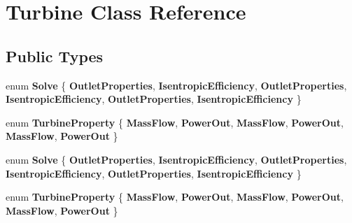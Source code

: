 \hypertarget{class_turbine}{}\section{Turbine Class Reference}
\label{class_turbine}
\subsection*{Public Types}
\begin{DoxyCompactItemize}
\item 
\mbox{\label{class_turbine_a9fd7beba6c6f071e228fbe3e07969d2b}} 
enum {\bfseries Solve} \{ \newline
{\bfseries Outlet\+Properties}, 
{\bfseries Isentropic\+Efficiency}, 
{\bfseries Outlet\+Properties}, 
{\bfseries Isentropic\+Efficiency}, 
\newline
{\bfseries Outlet\+Properties}, 
{\bfseries Isentropic\+Efficiency}
 \}
\item 
\mbox{\label{class_turbine_a5db4f65cf2539e3837684d53221ade12}} 
enum {\bfseries Turbine\+Property} \{ \newline
{\bfseries Mass\+Flow}, 
{\bfseries Power\+Out}, 
{\bfseries Mass\+Flow}, 
{\bfseries Power\+Out}, 
\newline
{\bfseries Mass\+Flow}, 
{\bfseries Power\+Out}
 \}
\item 
\mbox{\label{class_turbine_a9fd7beba6c6f071e228fbe3e07969d2b}} 
enum {\bfseries Solve} \{ \newline
{\bfseries Outlet\+Properties}, 
{\bfseries Isentropic\+Efficiency}, 
{\bfseries Outlet\+Properties}, 
{\bfseries Isentropic\+Efficiency}, 
\newline
{\bfseries Outlet\+Properties}, 
{\bfseries Isentropic\+Efficiency}
 \}
\item 
\mbox{\label{class_turbine_a5db4f65cf2539e3837684d53221ade12}} 
enum {\bfseries Turbine\+Property} \{ \newline
{\bfseries Mass\+Flow}, 
{\bfseries Power\+Out}, 
{\bfseries Mass\+Flow}, 
{\bfseries Power\+Out}, 
\newline
{\bfseries Mass\+Flow}, 
{\bfseries Power\+Out}
 \}
\item 
\mbox{\label{class_turbine_a9fd7beba6c6f071e228fbe3e07969d2b}} 

\end{DoxyCompactItemize}
